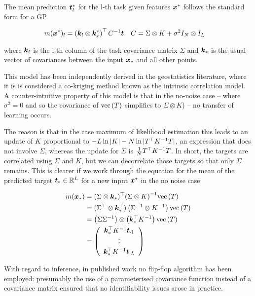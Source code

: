 The mean prediction $\bm t_l^*$ for the l-th task given features $\bm x^*$ follows the standard form for a GP.

\begin{align}
m(\bm x^*)_l & = \left(\bm k_l \otimes \bm k_x^* \right)^\top{C}^{-1} \bm t & C & = \Sigma \otimes K + \sigma^2 I_N \otimes I_L
\end{align}

where $\bm k_l$ is the l-th column of the task covariance matrix $\Sigma$ and $\bm k_*$ is the usual vector of covariances between the input $\bm x_*$ and all other points.

This model has been independently derived in the geostatistics literature, where it is is considered a co-kriging method known as the intrinsic correlation model\cite{Wackernagel1998}. A counter-intuitive property of this model is that in the no-noise case -- where $\sigma^2 = 0$ and so the covariance of $\text{vec}\left(T\right)$ simplifies to $\Sigma \otimes K$) -- no transfer of learning occurs. 

The reason is that in the case maximum of likelihood estimation this leads to an update of $K$ proportional to $-L \ln |K| - N \ln |T^\top {K}^{-1} T|$, an expression that does not involve $\Sigma$, whereas the update for $\Sigma$ is $\frac{1}{N}T^\top {K}^{-1} T$. In short, the targets are correlated using $\Sigma$ and $K$, but we can decorrelate those targets so that only $\Sigma$ remains. This is clearer if we work through the equation for the mean of the predicted target $\bm t_* \in { \mathbb{R}^{L} }$ for a new input $\bm x^*$ in the no noise case:

\begin{align}
m(\bm x_*) & = (\Sigma \otimes \bm k_*)^\top{\left( \Sigma \otimes K \right)}^{-1}\text{vec}\left(T\right) \\
& = (\Sigma^\top \otimes \bm k_*^\top)\left({\Sigma}^{-1} \otimes {K}^{-1}\right)\text{vec}\left(T\right)\\
& = \left(\Sigma {\Sigma}^{-1} \right) \otimes \left(\bm k_*^\top {K}^{-1}\right)\text{vec}\left(T\right) \\
& = \left( \begin{array}{c}
     \bm k_*^\top {K}^{-1} \bm t_{\cdot 1} \\
     \vdots \\
     \bm k_*^\top {K}^{-1} \bm t_{\cdot L} \\
 \end{array}\right) \\
\end{align}

With regard to inference, in published work\cite{Bonilla2008} no flip-flop algorithm has been employed: presumably the use of a parameterised covariance function instead of a covariance matrix ensured that no identifiability issues arose in practice.

